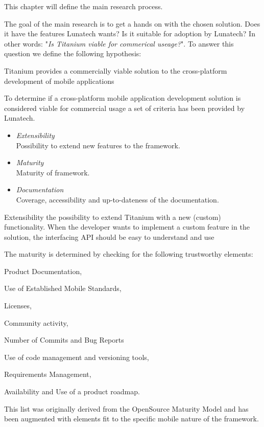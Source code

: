 This chapter will define the main research process. 

The goal of the main research is to get a hands on with the chosen solution. Does it have the features Lunatech wants? Is it suitable for adoption by Lunatech? In other words: "\emph{Is Titanium viable for commerical useage?}". To answer this question we define the following hypothesis:
\begin{shadequote}
Titanium provides a commercially viable solution to the cross-platform development of mobile applications%
\end{shadequote}

To determine if a cross-platform mobile application development solution is considered viable for commercial usage a set of criteria has been provided by Lunatech.
\begin{itemize}
	\item \emph{Extensibility}\\
	Possibility to extend new features to the framework.
	\item \emph{Maturity}\\ 
	Maturity of framework.
	\item \emph{Documentation}\\
	Coverage, accessibility and up-to-dateness of the documentation.
\end{itemize}


Extensibility the possibility to extend Titanium with a new (custom) functionality. 
When the developer wants to implement a custom feature in the solution, the interfacing API should be easy to understand and use

The maturity is determined by checking for the following trustworthy elements: \begin{inparaenum}
\item Product Documentation,
\item Use of Established Mobile Standards,
\item Licenses,
\item Community activity,
\item Number of Commits and Bug Reports
\item Use of code management and versioning tools,
\item Requirements Management,
\item Availability and Use of a product roadmap.
\end{inparaenum}
This list was originally derived from the OpenSource Maturity Model\cite{Wikipedia2011} and has been augmented with elements fit to the specific mobile nature of the framework.


